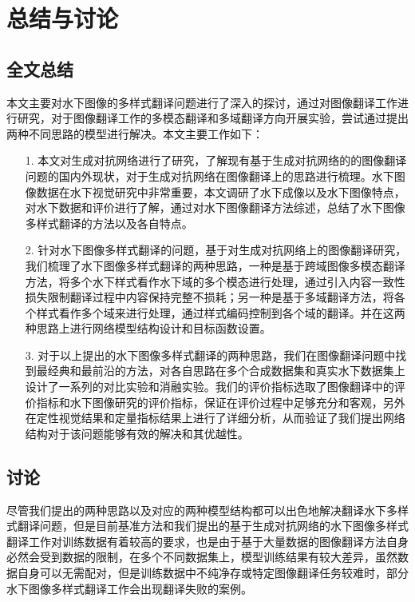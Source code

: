 \chapter{总结与讨论}
\section{全文总结}
本文主要对水下图像的多样式翻译问题进行了深入的探讨，通过对图像翻译工作进行研究，对于图像翻译工作的多模态翻译和多域翻译方向开展实验，尝试通过提出两种不同思路的模型进行解决。本文主要工作如下：

\begin{itemize}
	\item [1.]
	本文对生成对抗网络进行了研究，了解现有基于生成对抗网络的的图像翻译问题的国内外现状，对于生成对抗网络在图像翻译上的思路进行梳理。水下图像数据在水下视觉研究中非常重要，本文调研了水下成像以及水下图像特点，对水下数据和评价进行了解，通过对水下图像翻译方法综述，总结了水下图像多样式翻译的方法以及各自特点。
	
	\item [2.]
	针对水下图像多样式翻译的问题，基于对生成对抗网络上的图像翻译研究，我们梳理了水下图像多样式翻译的两种思路，一种是基于跨域图像多模态翻译方法，将多个水下样式看作水下域的多个模态进行处理，通过引入内容一致性损失限制翻译过程中内容保持完整不损耗；另一种是基于多域翻译方法，将各个样式看作多个域来进行处理，通过样式编码控制到各个域的翻译。并在这两种思路上进行网络模型结构设计和目标函数设置。

	\item [3.]
	对于以上提出的水下图像多样式翻译的两种思路，我们在图像翻译问题中找到最经典和最前沿的方法，对各自思路在多个合成数据集和真实水下数据集上设计了一系列的对比实验和消融实验。我们的评价指标选取了图像翻译中的评价指标和水下图像研究的评价指标，保证在评价过程中足够充分和客观，另外在定性视觉结果和定量指标结果上进行了详细分析，从而验证了我们提出网络结构对于该问题能够有效的解决和其优越性。

\end{itemize}

\section{讨论}
尽管我们提出的两种思路以及对应的两种模型结构都可以出色地解决翻译水下多样式翻译问题，但是目前基准方法和我们提出的基于生成对抗网络的水下图像多样式翻译工作对训练数据有着较高的要求，也是由于基于大量数据的图像翻译方法自身必然会受到数据的限制，在多个不同数据集上，模型训练结果有较大差异，虽然数据自身可以无需配对，但是训练数据中不纯净存或特定图像翻译任务较难时，部分水下图像多样式翻译工作会出现翻译失败的案例。


